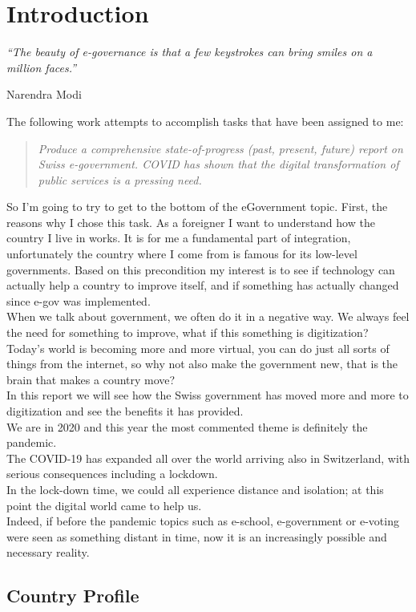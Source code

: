 \section{Introduction}
\epigraph{\centering \textit{“The beauty of e-governance is that a few keystrokes can bring smiles on a million faces.”}}{Narendra Modi}

The following work attempts to accomplish tasks that have been assigned to me:
\begin{quotation}
\textit{Produce a comprehensive state-of-progress (past, present, future) report on Swiss e-government. COVID has shown that the digital transformation of public services is a pressing need.}
\end{quotation}
So I'm going to try to get to the bottom of the eGovernment topic. First, the reasons why I chose this task.
As a foreigner I want to understand how the country I live in works. It is for me a fundamental part of integration, unfortunately the country where I come from is famous for its low-level governments. Based on this precondition my interest is to see if technology can actually help a country to improve itself, and if something has actually changed since e-gov was implemented.\\
When we talk about government, we often do it in a negative way.
We always feel the need for something to improve, what if this something is digitization?\\
Today's world is becoming more and more virtual, you can do just all sorts of things from the internet, so why not also make the government new, that is the brain that makes a country move?\\
In this report we will see how the Swiss government has moved more and more to digitization and see the benefits it has provided.\\
We are in 2020 and this year the most commented theme is definitely the pandemic.\\
The COVID-19 has expanded all over the world arriving also in Switzerland, with serious consequences including a lockdown.\\
In the lock-down time, we could all experience distance and isolation; at this point the digital world came to help us.\\
Indeed, if before the pandemic topics such as e-school, e-government or e-voting were seen as something distant in time, now it is an increasingly possible and necessary reality.\\
\newpage
\subsection{Country Profile}

